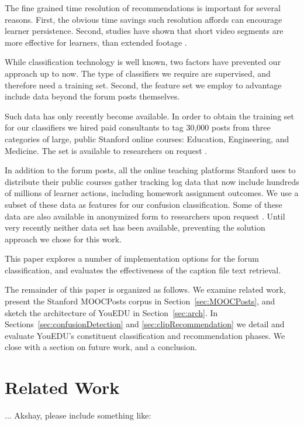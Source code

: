 \documentclass{edm_template}
\begin{document}
The fine grained time resolution of recommendations is important for
several reasons. First, the obvious time savings such resolution
affords can encourage learner persistence. Second, studies have shown
that short video segments are more effective for learners, than
extended footage \cite{Guo:2014:VPA:2556325.2566239}.

While classification technology is well known, two factors have
prevented our approach up to now. The type of classifiers we require
are supervised, and therefore need a training set. Second, the feature
set we employ to advantage include data beyond the forum posts
themselves. 

Such data has only recently become available. In order to obtain the
training set for our classifiers we hired paid consultants to tag
30,000 posts from three categories of large, public Stanford online
courses: Education, Engineering, and Medicine. The set is available to
researchers on request \cite{stanfordMOOCPosts}.

In addition to the forum posts, all the online teaching platforms
Stanford uses to distribute their public courses gather tracking log
data that now include hundreds of millions of learner actions,
including homework assignment outcomes. We use a subset of these data
as features for our confusion classification. Some of these data are
also available in anonymized form to researchers upon request
\cite{stanfordDataApps}. Until very recently neither data set has been
available, preventing the solution approach we chose for this
work.

This paper explores a number of implementation options for the forum
classification, and evaluates the effectiveness of the caption file
text retrieval.

The remainder of this paper is organized as follows. We examine
related work, present the Stanford MOOCPosts corpus in
Section~\ref{sec:MOOCPosts}, and sketch the architecture of YouEDU in
Section~\ref{sec:arch}.  In Sections~\ref{sec:confusionDetection} and
\ref{sec:clipRecommendation} we detail and evaluate YouEDU's constituent
classification and recommendation phases. We close with a section on
future work, and a conclusion.

\section{Related Work}
\label{sec:relWork}


... Akshay, please include something like:
\end{document}
